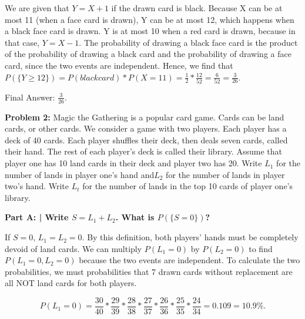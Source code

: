 \documentclass{article}
\begin{document}
 We are given that $Y=X+1$ if the drawn card is black. Because X can be at most 11 (when a face card is drawn), Y can be at most 12, which happens when a black face card is drawn. Y is at most 10 when a red card is drawn, because in that case, $Y=X-1$. The probability of drawing a black face card is the product of the probability of drawing a black card and the probability of drawing a face card, since the two events are independent. Hence, we find that $P(\{Y \geq 12\}) = P(black card) * P(X=11) = \frac{1}{2} * \frac{12}{52} = \frac{6}{52} = \frac{3}{26}$.\newline
 
 Final Answer: $\frac{3}{26}$.\newline
 
 \newpage
 
 \noindent\makebox[\linewidth]{\rule{\paperwidth}{0.4pt}}\newline
 
 \begin{center}
      \Large\textbf{Problem 2:} Magic the Gathering is a popular card game. Cards can be land cards, or other cards. We consider a game with two players. Each player has a deck of 40 cards. Each player shuffles their deck, then deals seven cards, called their hand. The rest of each player’s deck is called their library. Assume that player one has 10 land cards in their deck and player two has 20. Write $L_1$ for the number of lands in player one’s hand and$L_2$ for the number of lands in player two’s hand. Write $L_t$ for the number of lands in the top 10 cards of player one’s library.\par
 \end{center}
 
 \textbf{Part A: | Write $S = L_1 + L_2$. What is $P(\{S=0\})$?}\newline
 
 If $S=0$, $L_1 = L_2 = 0$. By this definition, both players' hands must be completely devoid of land cards. We can multiply $P(L_1=0)$ by $P(L_2=0)$ to find $P(L_1=0, L_2=0)$ because the two events are independent. To calculate the two probabilities, we must probabilities that 7 drawn cards without replacement are all NOT land cards for both players.
 
 \begin{displaymath}
    P(L_1 = 0) = \frac{30}{40}*\frac{29}{39}*\frac{28}{38}*\frac{27}{37}*\frac{26}{36}*\frac{25}{35}*\frac{24}{34} = 0.109 = 10.9\%.
 \end{displaymath}
 
\end{document}
